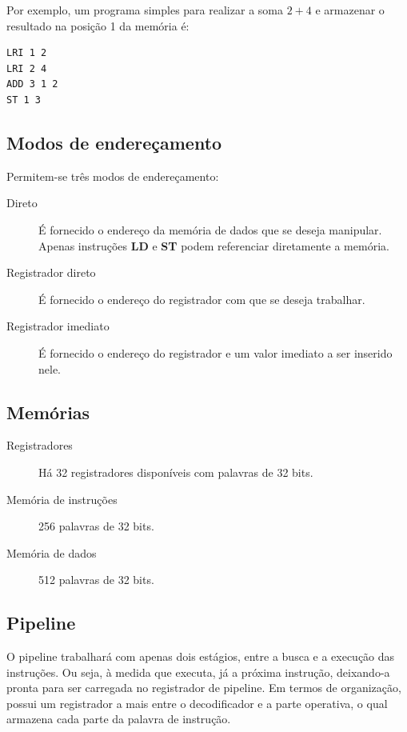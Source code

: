 \documentclass[a4paper]{article}
\begin{document}
Por exemplo, um programa simples para realizar a soma $2+4$ e armazenar 
o resultado na posição 1 da memória é:

\begin{lstlisting}
LRI 1 2
LRI 2 4
ADD 3 1 2
ST 1 3
\end{lstlisting}

\subsection{Modos de endereçamento}

Permitem-se três modos de endereçamento:

\begin{description}
    \item [Direto] É fornecido o endereço da memória de dados
    que se deseja manipular. Apenas instruções \textbf{LD} e \textbf{ST}
    podem referenciar diretamente a memória.
    \item [Registrador direto] É fornecido o endereço do
    registrador com que se deseja trabalhar.
    \item [Registrador imediato] É fornecido o endereço
    do registrador e um valor imediato a ser inserido
    nele.
\end{description}

\subsection{Memórias}

\begin{description}

\item [Registradores]
Há 32 registradores disponíveis com palavras de 32 bits.

\item [Memória de instruções]
256 palavras de 32 bits.

\item [Memória de dados]
512 palavras de 32 bits.
\end{description}

\subsection{Pipeline}
O pipeline trabalhará com apenas dois estágios, entre
a busca e a execução das instruções. Ou seja, à medida
que executa, já a próxima instrução, deixando-a pronta para
ser carregada no registrador de pipeline. Em termos de organização,
possui um registrador a mais entre o decodificador e a parte operativa,
o qual armazena cada parte da palavra de instrução.
\end{document}
